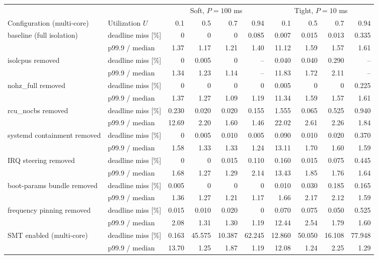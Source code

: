 \begin{tabular}{l|l|rrrr|rrrr}
\toprule
 &  & \multicolumn{4}{c}{Soft, $P = 100$ ms} & \multicolumn{4}{c}{Tight, $P = 10$ ms} \\
Configuration (multi-core) & Utilization $U$ & 0.1 & 0.5 & 0.7 & 0.94 & 0.1 & 0.5 & 0.7 & 0.94 \\
\midrule
\multirow[t]{2}{*}{baseline (full isolation)} & deadline miss [\%] & 0 & 0 & 0 & 0.085 & 0.007 & 0.015 & 0.013 & 0.335 \\
 & p99.9 / median & 1.37 & 1.17 & 1.21 & 1.40 & 11.12 & 1.59 & 1.57 & 1.61 \\
\cmidrule{1-10}
\multirow[t]{2}{*}{isolcpus removed} & deadline miss [\%] & 0 & 0.005 & 0 & -- & 0.040 & 0.040 & 0.290 & -- \\
 & p99.9 / median & 1.34 & 1.23 & 1.14 & -- & 11.83 & 1.72 & 2.11 & -- \\
\cmidrule{1-10}
\multirow[t]{2}{*}{nohz_full removed} & deadline miss [\%] & 0 & 0 & 0 & 0 & 0.005 & 0 & 0 & 0.225 \\
 & p99.9 / median & 1.37 & 1.27 & 1.09 & 1.19 & 11.34 & 1.59 & 1.57 & 1.61 \\
\cmidrule{1-10}
\multirow[t]{2}{*}{rcu_nocbs removed} & deadline miss [\%] & 0.230 & 0.020 & 0.020 & 0.155 & 1.555 & 0.065 & 0.525 & 0.940 \\
 & p99.9 / median & 12.69 & 2.20 & 1.60 & 1.46 & 22.02 & 2.61 & 2.26 & 1.84 \\
\cmidrule{1-10}
\multirow[t]{2}{*}{systemd containment removed} & deadline miss [\%] & 0 & 0.005 & 0.010 & 0.005 & 0.090 & 0.010 & 0.020 & 0.370 \\
 & p99.9 / median & 1.58 & 1.33 & 1.33 & 1.24 & 13.11 & 1.70 & 1.60 & 1.59 \\
\cmidrule{1-10}
\multirow[t]{2}{*}{IRQ steering removed} & deadline miss [\%] & 0 & 0 & 0.015 & 0.110 & 0.160 & 0.015 & 0.075 & 0.445 \\
 & p99.9 / median & 1.68 & 1.27 & 1.29 & 2.14 & 13.43 & 1.85 & 1.76 & 1.64 \\
\cmidrule{1-10}
\multirow[t]{2}{*}{boot-params bundle removed} & deadline miss [\%] & 0.005 & 0 & 0 & 0 & 0.010 & 0.030 & 0.185 & 0.165 \\
 & p99.9 / median & 1.36 & 1.27 & 1.21 & 1.17 & 1.66 & 2.17 & 2.12 & 1.59 \\
\cmidrule{1-10}
\multirow[t]{2}{*}{frequency pinning removed} & deadline miss [\%] & 0.015 & 0.010 & 0.020 & 0 & 0.070 & 0.075 & 0.050 & 0.525 \\
 & p99.9 / median & 2.08 & 1.31 & 1.30 & 1.19 & 12.44 & 2.54 & 1.79 & 1.60 \\
\cmidrule{1-10}
\multirow[t]{2}{*}{SMT enabled (multi-core)} & deadline miss [\%] & 0.163 & 45.575 & 10.387 & 62.245 & 12.860 & 50.050 & 16.108 & 77.948 \\
 & p99.9 / median & 13.70 & 1.25 & 1.87 & 1.19 & 12.08 & 1.24 & 2.25 & 1.29 \\
\bottomrule
\end{tabular}
